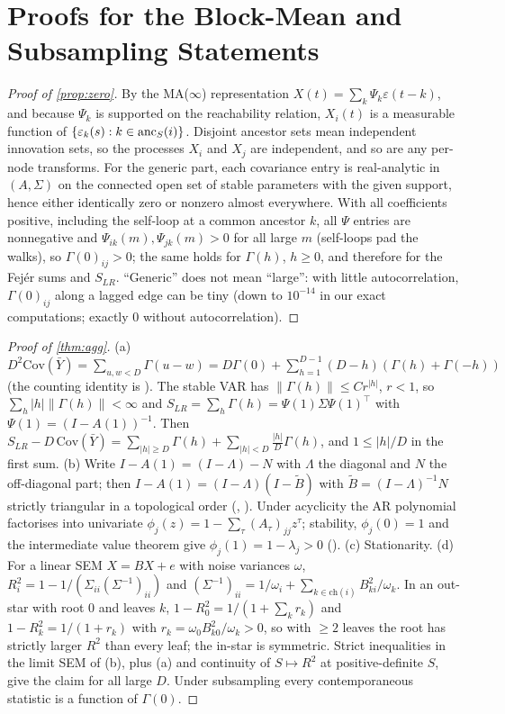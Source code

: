 \section{Proofs for the Block-Mean and Subsampling Statements}
\label{app:agg}

\begin{proof}[Proof of \cref{prop:zero}]
By the MA($\infty$) representation $X(t)=\sum_k\Psi_k\varepsilon(t-k)$, and
because $\Psi_k$ is supported on the reachability relation, $X_i(t)$ is a
measurable function of $\{\varepsilon_k(s):k\in\mathrm{anc}_S(i)\}$. Disjoint ancestor
sets mean independent innovation sets, so the processes $X_i$ and $X_j$ are
independent, and so are any per-node transforms. For the generic part, each
covariance entry is real-analytic in $(A,\Sigma)$ on the connected open set of
stable parameters with the given support, hence either identically zero or
nonzero almost everywhere. With all coefficients positive, including the
self-loop at a common ancestor $k$, all $\Psi$ entries are nonnegative and
$\Psi_{ik}(m),\Psi_{jk}(m)>0$ for all large $m$ (self-loops pad the walks), so
$\Gamma(0)_{ij}>0$; the same holds for $\Gamma(h)$, $h\ge0$, and therefore for
the Fej\'er sums and $S_{LR}$. ``Generic'' does not mean ``large'': with little
autocorrelation, $\Gamma(0)_{ij}$ along a lagged edge can be tiny (down to
$10^{-14}$ in our exact computations; exactly $0$ without autocorrelation).
\end{proof}

\begin{proof}[Proof of \cref{thm:agg}]
(a) $D^2\mathrm{Cov}(\bar Y)=\sum_{u,w<D}\Gamma(u-w)=D\Gamma(0)+\sum_{h=1}^{D-1}(D-h)(\Gamma(h)+\Gamma(-h))$
(the counting identity is ). The stable VAR has
$\|\Gamma(h)\|\le C r^{|h|}$, $r<1$, so $\sum_h|h|\|\Gamma(h)\|<\infty$ and
$S_{LR}=\sum_h\Gamma(h)=\Psi(1)\Sigma\Psi(1)^\top$ with
$\Psi(1)=(I-A(1))^{-1}$. Then
$S_{LR}-D\,\mathrm{Cov}(\bar Y)=\sum_{|h|\ge D}\Gamma(h)+\sum_{|h|<D}\frac{|h|}{D}\Gamma(h)$,
and $1\le|h|/D$ in the first sum.
(b) Write $I-A(1)=(I-\Lambda)-N$ with $\Lambda$ the diagonal and $N$ the
off-diagonal part; then $I-A(1)=(I-\Lambda)(I-\tilde B)$ with
$\tilde B=(I-\Lambda)^{-1}N$ strictly triangular in a topological order
(, ). Under acyclicity the AR
polynomial factorises into univariate $\phi_j(z)=1-\sum_\tau(A_\tau)_{jj}z^\tau$;
stability, $\phi_j(0)=1$ and the intermediate value theorem give
$\phi_j(1)=1-\lambda_j>0$ ().
(c) Stationarity.
(d) For a linear SEM $X=BX+e$ with noise variances $\omega$,
$R^2_i=1-1/(\Sigma_{ii}(\Sigma^{-1})_{ii})$ and
$(\Sigma^{-1})_{ii}=1/\omega_i+\sum_{k\in\mathrm{ch}(i)}B_{ki}^2/\omega_k$. In
an out-star with root $0$ and leaves $k$, $1-R^2_0=1/(1+\sum_kr_k)$ and
$1-R^2_k=1/(1+r_k)$ with $r_k=\omega_0B_{k0}^2/\omega_k>0$, so with $\ge2$
leaves the root has strictly larger $R^2$ than every leaf; the in-star is
symmetric. Strict inequalities in the limit SEM of (b), plus (a) and
continuity of $S\mapsto R^2$ at positive-definite $S$, give the claim for all
large $D$. Under subsampling every contemporaneous statistic is a function of
$\Gamma(0)$.
\end{proof}

